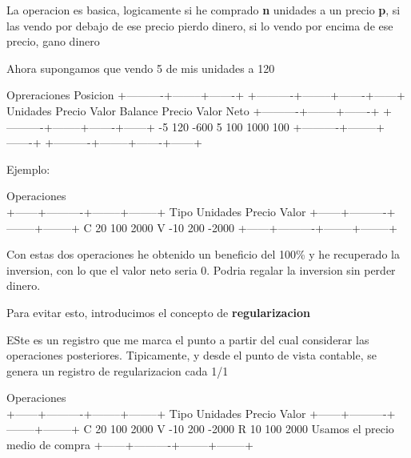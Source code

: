 \documentclass[
  twocolumn]{article}
\begin{document}
La operacion es basica, logicamente si he comprado \textbf{n} unidades a
un precio \textbf{p}, si las vendo por debajo de ese precio pierdo
dinero, si lo vendo por encima de ese precio, gano dinero

Ahora supongamos que vendo 5 de mis unidades a 120

Opreraciones Posicion +----------+--------+-------+
+----------+--------+-------+------+\\
\textbar{} Unidades \textbar{} Precio \textbar{} Valor \textbar{}
\textbar{} Balance \textbar{} Precio \textbar{} Valor \textbar{} Neto
\textbar{} +----------+--------+-------+
+----------+--------+-------+------+ \textbar{} -5 \textbar{} 120
\textbar{} -600 \textbar{} \textbar{} 5 \textbar{} 100 \textbar{} 1000
\textbar{} 100 \textbar{} +----------+--------+-------+
+----------+--------+-------+------+

Ejemplo:

Operaciones\\
+------+----------+--------+--------+ \textbar{} Tipo \textbar{}
Unidades \textbar{} Precio \textbar{} Valor \textbar{}
+------+----------+--------+--------+ \textbar{} C \textbar{} 20
\textbar{} 100 \textbar{} 2000 \textbar{} \textbar{} V \textbar{} -10
\textbar{} 200 \textbar{} -2000 \textbar{}
+------+----------+--------+--------+

Con estas dos operaciones he obtenido un beneficio del 100\% y he
recuperado la inversion, con lo que el valor neto seria 0. Podria
regalar la inversion sin perder dinero.

Para evitar esto, introducimos el concepto de \textbf{regularizacion}

ESte es un registro que me marca el punto a partir del cual considerar
las operaciones posteriores. Tipicamente, y desde el punto de vista
contable, se genera un registro de regularizacion cada 1/1

Operaciones\\
+------+----------+--------+--------+ \textbar{} Tipo \textbar{}
Unidades \textbar{} Precio \textbar{} Valor \textbar{}
+------+----------+--------+--------+ \textbar{} C \textbar{} 20
\textbar{} 100 \textbar{} 2000 \textbar{} \textbar{} V \textbar{} -10
\textbar{} 200 \textbar{} -2000 \textbar{} \textbar{} R \textbar{} 10
\textbar{} 100 \textbar{} 2000 \textbar{} Usamos el precio medio de
compra +------+----------+--------+--------+
\end{document}
